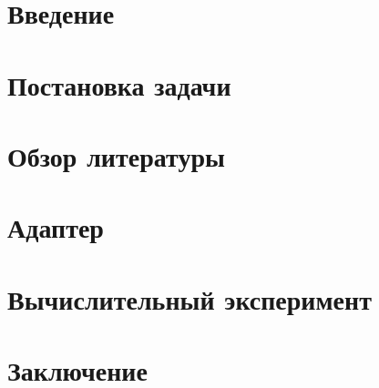\documentclass[a4paper, article, 14pt]{extarticle}
\begin{document}


\newpage
\tableofcontents
\pagebreak



\newpage
\section{Введение}


\newpage
\section{Постановка задачи}


\newpage
\section{Обзор литературы}


\newpage
\section{Адаптер}


\newpage
\section{Вычислительный эксперимент}


\newpage
\section{Заключение}



\newpage


\end{document}
